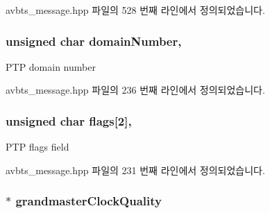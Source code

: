 avbts\+\_\+message.\+hpp 파일의 528 번째 라인에서 정의되었습니다.

\subsubsection[{\texorpdfstring{domain\+Number}{domainNumber}}]{\setlength{\rightskip}{0pt plus 5cm}unsigned char domain\+Number\hspace{0.3cm}{\ttfamily [protected]}, {\ttfamily [inherited]}}\hypertarget{class_p_t_p_message_common_a0443527ff087aecea2cac4f6e84d189c}{}\label{class_p_t_p_message_common_a0443527ff087aecea2cac4f6e84d189c}
P\+TP domain number 

avbts\+\_\+message.\+hpp 파일의 236 번째 라인에서 정의되었습니다.

\subsubsection[{\texorpdfstring{flags}{flags}}]{\setlength{\rightskip}{0pt plus 5cm}unsigned char flags\mbox{[}2\mbox{]}\hspace{0.3cm}{\ttfamily [protected]}, {\ttfamily [inherited]}}\hypertarget{class_p_t_p_message_common_a8c2f6104634deb80d932fa0cd9166fba}{}\label{class_p_t_p_message_common_a8c2f6104634deb80d932fa0cd9166fba}
P\+TP flags field 

avbts\+\_\+message.\+hpp 파일의 231 번째 라인에서 정의되었습니다.

\subsubsection[{\texorpdfstring{grandmaster\+Clock\+Quality}{grandmasterClockQuality}}]{$\ast$ grandmaster\+Clock\+Quality\hspace{0.3cm}{\ttfamily [private]}}\hypertarget{class_p_t_p_message_announce_aa67cf6cb88ed67b2850993312a7cd5f2}{}\label{class_p_t_p_message_announce_aa67cf6cb88ed67b2850993312a7cd5f2}


